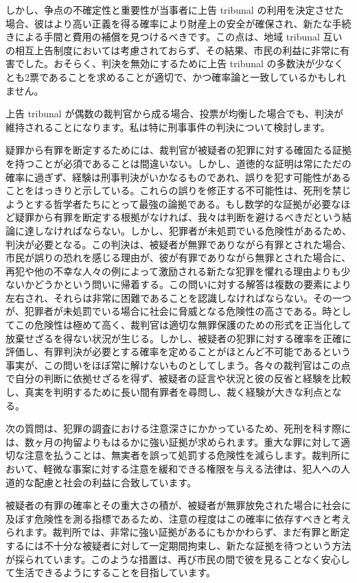 \documentclass[a4paper,11pt,openany]{ltjsbook}
\begin{document}
しかし、争点の不確定性と重要性が当事者に上告 tribunal の利用を決定させた場合、彼はより高い正義を得る確率により財産上の安全が確保され、新たな手続きによる手間と費用の補償を見つけるべきです。この点は、地域 tribunal 互いの相互上告制度においては考慮されておらず、その結果、市民の利益に非常に有害でした。おそらく、判決を無効にするために上告 tribunal の多数決が少なくとも2票であることを求めることが適切で、かつ確率論と一致しているかもしれません。

上告 tribunal が偶数の裁判官から成る場合、投票が均衡した場合でも、判決が維持されることになります。私は特に刑事事件の判決について検討します。

疑罪から有罪を断定するためには、裁判官が被疑者の犯罪に対する確固たる証拠を持つことが必須であることは間違いない。しかし、道徳的な証明は常にただの確率に過ぎず、経験は刑事判決がいかなるものであれ、誤りを犯す可能性があることをはっきりと示している。これらの誤りを修正する不可能性は、死刑を禁じようとする哲学者たちにとって最強の論拠である。もし数学的な証拠が必要なほど疑罪から有罪を断定する根拠がなければ、我々は判断を避けるべきだという結論に達しなければならない。しかし、犯罪者が未処罰でいる危険性があるため、判決が必要となる。この判決は、被疑者が無罪でありながら有罪とされた場合、市民が誤りの恐れを感じる理由が、彼が有罪でありながら無罪とされた場合に、再犯や他の不幸な人々の例によって激励される新たな犯罪を懼れる理由よりも少ないかどうかという問いに帰着する。この問いに対する解答は複数の要素により左右され、それらは非常に困難であることを認識しなければならない。その一つが、犯罪者が未処罰でいる場合に社会に脅威となる危険性の高さである。時としてこの危険性は極めて高く、裁判官は適切な無罪保護のための形式を正当化して放棄せざるを得ない状況が生じる。しかし、被疑者の犯罪に対する確率を正確に評価し、有罪判決が必要とする確率を定めることがほとんど不可能であるという事実が、この問いをほぼ常に解けないものとしてしまう。各々の裁判官はこの点で自分の判断に依拠せざるを得ず、被疑者の証言や状況と彼の反省と経験を比較し、真実を判明するために長い間有罪者を尋問し、裁く経験が大きな利点となる。

次の質問は、犯罪の調査における注意深さにかかっているため、死刑を科す際には、数ヶ月の拘留よりもはるかに強い証拠が求められます。重大な罪に対して適切な注意を払うことは、無実者を誤って処罰する危険性を減らします。裁判所において、軽微な事案に対する注意を緩和できる権限を与える法律は、犯人への人道的な配慮と社会の利益に合致しています。

被疑者の有罪の確率とその重大さの積が、被疑者が無罪放免された場合に社会に及ぼす危険性を測る指標であるため、注意の程度はこの確率に依存すべきと考えられます。裁判所では、非常に強い証拠があるにもかかわらず、まだ有罪と断定するには不十分な被疑者に対して一定期間拘束し、新たな証拠を待つという方法が採られています。このような措置は、再び市民の間で彼を見ることなく安心して生活できるようにすることを目指しています。
\end{document}
